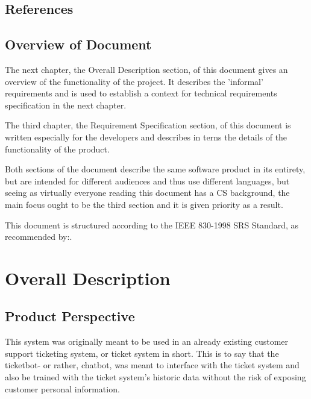 \documentclass[11pt]{article}
\begin{document}
\subsection{References}



\subsection{Overview of Document}
The next chapter, the Overall Description section, of this document gives an overview of the functionality of the project. It describes the 'informal' requirements and is used to establish a context for technical requirements specification in the next chapter.\par
The third chapter, the Requirement Specification section, of this document is written especially for the developers and describes in terns the details of the functionality of the product.\par
Both sections of the document describe the same software product in its entirety, but are intended for different audiences and thus use different languages, but seeing as virtually everyone reading this document has a CS background, the main focus ought to be the third section and it is given priority as a result.\par
This document is structured according to the IEEE 830-1998 SRS Standard\cite{Standard:1}, as recommended by:\cite{Book:1}.

\section{Overall Description}
\subsection{Product Perspective}
 
This system was originally meant to be used in an already existing customer support ticketing system, or ticket system in short. This is to say that the ticketbot- or rather, chatbot, was meant to interface with the ticket system and also be trained with the ticket system's historic data without the risk of exposing customer personal information.\par
\end{document}
